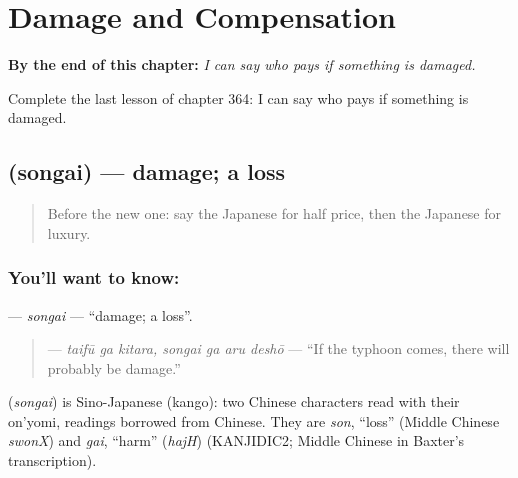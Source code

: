 
\chapter{Damage and Compensation}
\label{ch:ja-damage-and-compensation}

\begin{chapteropening}
\textbf{By the end of this chapter:} \emph{I can say who pays if something is damaged.}

Complete the last lesson of chapter 364: I can say who pays if something is damaged.
\end{chapteropening}

\section[\texorpdfstring{\ja{そんがい} (songai)}{そんがい (songai)}]{ (songai) — damage; a loss}

\label{lesson:JA-C364-songai}



\begin{quote}
Before the new one: say the Japanese for half price, then the Japanese for luxury.
\end{quote}

\subsection*{You'll want to know: }
\textbf{} — \emph{songai} — \textquotedblleft{}damage; a loss\textquotedblright{}.

\begin{quote}
\textbf{  } — \emph{taifū ga kitara, songai ga aru deshō} — \textquotedblleft{}If the typhoon comes, there will probably be damage.\textquotedblright{}
\end{quote}

\begin{cousinweb}
\textbf{} (\emph{songai}) is Sino-Japanese (kango): two Chinese characters read with their on'yomi, readings borrowed from Chinese. They are \emph{son}, \textquotedblleft{}loss\textquotedblright{} (Middle Chinese \emph{swonX}) and \emph{gai}, \textquotedblleft{}harm\textquotedblright{} (\emph{hajH}) (KANJIDIC2; Middle Chinese in Baxter's transcription).
\end{cousinweb}

